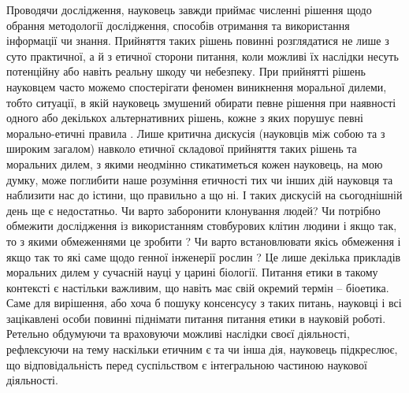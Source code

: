 Проводячи дослідження, науковець завжди приймає численні рішення щодо обрання методології дослідження, способів отримання та використання інформації чи знання. Прийняття таких рішень повинні розглядатися не лише з суто практичної, а й з етичної сторони питання, коли можливі їх наслідки несуть потенційну або навіть реальну шкоду чи небезпеку. При прийнятті рішень науковцем часто можемо спостерігати феномен виникнення моральної дилеми, тобто ситуації, в якій науковець змушений обирати певне рішення при наявності одного або декількох альтернативних рішень, кожне з яких порушує певні морально-етичні правила \cite{sep-moral-dilemmas}. Лише критична дискусія (науковців між собою та з широким загалом) навколо етичної складової прийняття таких рішень та моральних дилем, з якими неодмінно стикатиметься кожен науковець, на мою думку, може поглибити наше розуміння етичності тих чи інших дій науковця та наблизити нас до істини, що правильно а що ні. І таких дискусій на сьогоднішній день ще є недостатньо. Чи варто заборонити клонування людей? Чи потрібно обмежити дослідження із використанням стовбурових клітин людини і якщо так, то з якими обмеженнями це зробити \cite{lachmann2001stem}? Чи варто встановлювати якісь обмеження і якщо так то які саме щодо генної інженерії рослин \cite{trewavas2001opposition}\cite{flothmann2001maize}? Це лише декілька прикладів моральних дилем у сучасній науці у царині біології. Питання етики в такому контексті є настільки важливим, що навіть має свій окремий термін -- біоетика. Саме для вирішення, або хоча б пошуку консенсусу з таких питань, науковці і всі зацікавлені особи повинні піднімати питання питання етики в науковій роботі. Ретельно обдумуючи та враховуючи можливі наслідки своєї діяльності, рефлексуючи на тему наскільки етичним є та чи інша дія, науковець підкреслює, що відповідальність перед суспільством є інтегральною частиною наукової діяльності.

